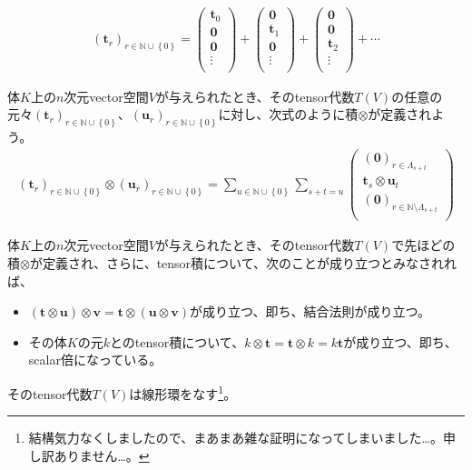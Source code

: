 \documentclass[dvipdfmx]{jsarticle}
\begin{document}
\begin{dfn}
\begin{align*}
\left( \mathbf{t}_{r} \right)_{r \in \mathbb{N} \cup \left\{ 0 \right\}} = \begin{pmatrix}
\mathbf{t}_{0} \\
\mathbf{0} \\
\mathbf{0} \\
 \vdots \\
\end{pmatrix} + \begin{pmatrix}
\mathbf{0} \\
\mathbf{t}_{1} \\
\mathbf{0} \\
 \vdots \\
\end{pmatrix} + \begin{pmatrix}
\mathbf{0} \\
\mathbf{0} \\
\mathbf{t}_{2} \\
 \vdots \\
\end{pmatrix} + \cdots
\end{align*}
\end{dfn}
\begin{dfn}
体$K$上の$n$次元vector空間$V$が与えられたとき、そのtensor代数$T(V)$の任意の元々$\left( \mathbf{t}_{r} \right)_{r \in \mathbb{N} \cup \left\{ 0 \right\}}$、$\left( \mathbf{u}_{r} \right)_{r \in \mathbb{N} \cup \left\{ 0 \right\}}$に対し、次式のように積$\otimes$が定義されよう。
\begin{align*}
\left( \mathbf{t}_{r} \right)_{r \in \mathbb{N} \cup \left\{ 0 \right\}} \otimes \left( \mathbf{u}_{r} \right)_{r \in \mathbb{N} \cup \left\{ 0 \right\}} = \sum_{u \in \mathbb{N} \cup \left\{ 0 \right\}} {\sum_{s + t = u} \begin{pmatrix}
\left( \mathbf{0} \right)_{r \in \varLambda_{s + t}} \\
\mathbf{t}_{s} \otimes \mathbf{u}_{t} \\
\left( \mathbf{0} \right)_{r \in \mathbb{N} \setminus \varLambda_{s + t}} \\
\end{pmatrix}}
\end{align*}
\end{dfn}
\begin{thm}\label{2.4.10.4}
体$K$上の$n$次元vector空間$V$が与えられたとき、そのtensor代数$T(V)$で先ほどの積$\otimes$が定義され、さらに、tensor積について、次のことが成り立つとみなされれば、
\begin{itemize}
\item
  $\left( \mathbf{t} \otimes \mathbf{u} \right) \otimes \mathbf{v} = \mathbf{t} \otimes \left( \mathbf{u} \otimes \mathbf{v} \right)$が成り立つ、即ち、結合法則が成り立つ。
\item
  その体$K$の元$k$とのtensor積について、$k \otimes \mathbf{t} = \mathbf{t} \otimes k = k\mathbf{t}$が成り立つ、即ち、scalar倍になっている。
\end{itemize}
そのtensor代数$T(V)$は線形環をなす\footnote{結構気力なくしましたので、まあまあ雑な証明になってしまいました…。申し訳ありません…。}。
\end{thm}
\end{document}
